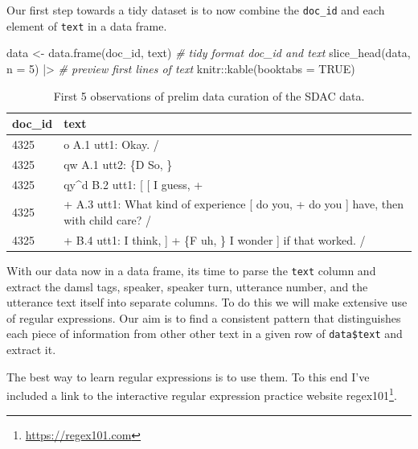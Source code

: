 \documentclass[
  letterpaper,
]{latex/krantz}
\newenvironment{Shaded}{\begin{snugshade}}{\end{snugshade}}
\newcommand{\AttributeTok}[1]{\textcolor[rgb]{0.00,0.00,0.00}{#1}}
\newcommand{\CommentTok}[1]{\textcolor[rgb]{0.00,0.00,0.00}{\textit{#1}}}
\newcommand{\ConstantTok}[1]{\textcolor[rgb]{0.00,0.00,0.00}{#1}}
\newcommand{\DecValTok}[1]{\textcolor[rgb]{0.00,0.00,0.00}{#1}}
\newcommand{\FunctionTok}[1]{\textcolor[rgb]{0.00,0.00,0.00}{#1}}
\newcommand{\NormalTok}[1]{\textcolor[rgb]{0.00,0.00,0.00}{#1}}
\newcommand{\OtherTok}[1]{\textcolor[rgb]{0.00,0.00,0.00}{#1}}
\newcommand{\SpecialCharTok}[1]{\textcolor[rgb]{0.00,0.00,0.00}{#1}}
\DeclareRobustCommand{\href}[2]{#2\footnote{\url{#1}}}
\begin{document}
Our first step towards a tidy dataset is to now combine the
\texttt{doc\_id} and each element of \texttt{text} in a data frame.

\begin{Shaded}
\begin{Highlighting}[]
\NormalTok{data }\OtherTok{\textless{}{-}} \FunctionTok{data.frame}\NormalTok{(doc\_id, text) }\CommentTok{\# tidy format \textasciigrave{}doc\_id\textasciigrave{} and \textasciigrave{}text\textasciigrave{}}
\FunctionTok{slice\_head}\NormalTok{(data, }\AttributeTok{n =} \DecValTok{5}\NormalTok{) }\SpecialCharTok{|\textgreater{}} \CommentTok{\# preview first lines of \textasciigrave{}text\textasciigrave{}}
\NormalTok{  knitr}\SpecialCharTok{::}\FunctionTok{kable}\NormalTok{(}\AttributeTok{booktabs =} \ConstantTok{TRUE}\NormalTok{)}
\end{Highlighting}
\end{Shaded}

\hypertarget{tbl-cd-semi-sdac-text-8}{}
\begin{table}
\caption{\label{tbl-cd-semi-sdac-text-8}First 5 observations of prelim data curation of the SDAC data. }\tabularnewline

\centering
\begin{tabular}{ll}
\toprule
doc\_id & text\\
\midrule
4325 & o          A.1 utt1: Okay.  /\\
4325 & qw          A.1 utt2: \{D So, \}\\
4325 & qy\textasciicircum{}d          B.2 utt1: [ [ I guess, +\\
4325 & +          A.3 utt1: What kind of experience [ do you, + do you ] have, then with child care? /\\
4325 & +          B.4 utt1: I think, ] + \{F uh, \} I wonder ] if that worked. /\\
\bottomrule
\end{tabular}
\end{table}

With our data now in a data frame, its time to parse the \texttt{text}
column and extract the damsl tags, speaker, speaker turn, utterance
number, and the utterance text itself into separate columns. To do this
we will make extensive use of regular expressions. Our aim is to find a
consistent pattern that distinguishes each piece of information from
other other text in a given row of \texttt{data\$text} and extract it.

The best way to learn regular expressions is to use them. To this end
I've included a link to the interactive regular expression practice
website \href{https://regex101.com}{regex101}.
\end{document}
